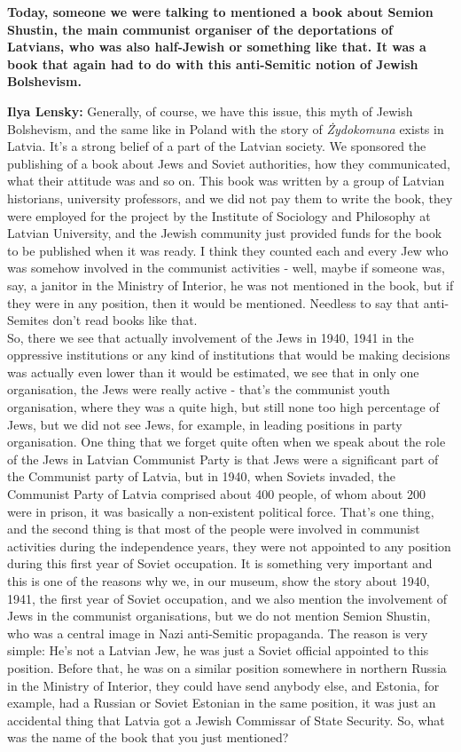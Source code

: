 \textbf{Today, someone we were talking to mentioned a book about Semion Shustin, the main communist organiser of the deportations of Latvians, who was also half-Jewish or something like that. It was a book that again had to do with this anti-Semitic notion of Jewish Bolshevism.} 

\textbf{Ilya Lensky:} Generally, of course, we have this issue, this myth of Jewish Bolshevism, and the same like in Poland with the story of \textit{Żydokomuna} exists in Latvia. It’s a strong belief of a part of the Latvian society. We sponsored the publishing of a book about Jews and Soviet authorities, how they communicated, what their attitude was and so on. This book was written by a group of Latvian historians, university professors, and we did not pay them to write the book, they were employed for the project by the Institute of Sociology and Philosophy at Latvian University, and the Jewish community just provided funds for the book to be published when it was ready. I think they counted each and every Jew who was somehow involved in the communist activities - well, maybe if someone was, say, a janitor in the Ministry of Interior, he was not mentioned in the book, but if they were in any position, then it would be mentioned. Needless to say that anti-Semites don’t read books like that.\\
So, there we see that actually involvement of the Jews in 1940, 1941 in the oppressive institutions or any kind of institutions that would be making decisions was actually even lower than it would be estimated, we see that in only one organisation, the Jews were really active - that’s the communist youth organisation, where they was a quite high, but still none too high percentage of Jews, but we did not see Jews, for example, in leading positions in party organisation. One thing that we forget quite often when we speak about the role of the Jews in Latvian Communist Party is that Jews were  a significant part of the Communist party of Latvia, but in 1940, when Soviets invaded, the Communist Party of Latvia comprised about 400 people, of whom about 200 were in prison, it was basically a non-existent political force. That’s one thing, and the second thing is that most of the people were involved in communist activities during the independence years, they were not appointed to any position during this first year of Soviet occupation. It is something very important and this is one of the reasons why we, in our museum, show the story about 1940, 1941, the first year of Soviet occupation, and we also mention the involvement of Jews in the communist organisations, but we do not mention Semion Shustin, who was a central image in Nazi anti-Semitic propaganda. The reason is very simple: He’s not a Latvian Jew, he was just a Soviet official appointed to this position. Before that, he was on a similar position somewhere in northern Russia in the Ministry of Interior, they could have send anybody else, and Estonia, for example, had a Russian or Soviet Estonian in the same position, it was just an accidental thing that Latvia got a Jewish Commissar of State Security. So, what was the name of the book that you just mentioned? 

